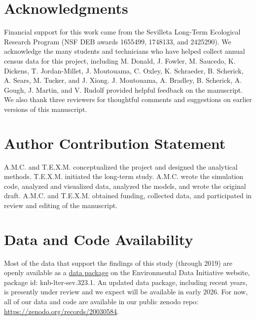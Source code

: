 \documentclass[11pt]{article}
\begin{document}
\section*{Acknowledgments}
Financial support for this work came from the Sevilleta Long-Term Ecological Research Program (NSF DEB awards 1655499, 1748133, and 2425290).
We acknowledge the many students and technicians who have helped collect annual census data for this project, including M. Donald, J. Fowler, M. Saucedo, K. Dickens, T. Jordan-Millet, J. Moutouama, C. Oxley, K. Schraeder, B. Scherick, A. Sears, M. Tucker, and J. Xiong. 
J. Moutouama, A. Bradley, B. Scherick, A. Gough, J. Martin, and V. Rudolf provided helpful feedback on the manuscript. 
We also thank three reviewers for thoughtful comments and suggestions on earlier versions of this manuscript.

\section*{Author Contribution Statement}
A.M.C. and T.E.X.M. conceptualized the project and designed the analytical methods. T.E.X.M. initiated the long-term study. A.M.C. wrote the simulation code, analyzed and visualized data, analyzed the models, and wrote the original draft. 
A.M.C. and T.E.X.M. obtained funding, collected data, and participated in review and editing of the manuscript.


\section*{Data and Code Availability}

Most of the data that support the findings of this study (through 2019) are openly available as a \href{https://portal.edirepository.org/nis/mapbrowse?packageid=knb-lter-sev.323.1}{data package} \citep{DataCholla} on the Environmental Data Initiative website, package id: knb-lter-sev.323.1.
An updated data package, including recent years, is presently under review and we expect will be available in early 2026. 
For now, all of our data and code are available in our public zenodo repo: \url{https://zenodo.org/records/20030584}.


\renewcommand{\theequation}{A\arabic{equation}}
\renewcommand{\thetable}{A\arabic{table}}
\setcounter{equation}{0}  
\setcounter{figure}{0}
\setcounter{table}{0}



\end{document}
